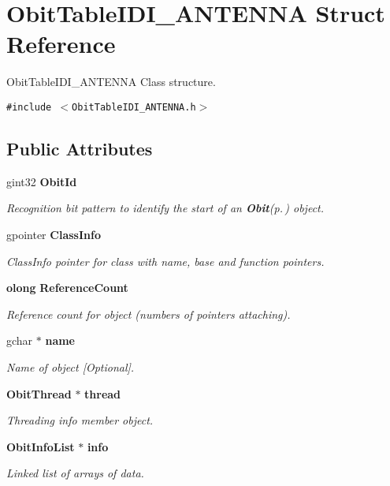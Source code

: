 \section{Obit\-Table\-IDI\_\-ANTENNA Struct Reference}
\label{structObitTableIDI__ANTENNA}
Obit\-Table\-IDI\_\-ANTENNA Class structure.  


{\tt \#include $<$Obit\-Table\-IDI\_\-ANTENNA.h$>$}

\subsection*{Public Attributes}
\begin{CompactItemize}
\item 
gint32 {\bf Obit\-Id}
\begin{CompactList}\small\item\em Recognition bit pattern to identify the start of an {\bf Obit}{\rm (p.\,\pageref{structObit})} object. \item\end{CompactList}\item 
gpointer {\bf Class\-Info}
\begin{CompactList}\small\item\em Class\-Info pointer for class with name, base and function pointers. \item\end{CompactList}\item 
{\bf olong} {\bf Reference\-Count}
\begin{CompactList}\small\item\em Reference count for object (numbers of pointers attaching). \item\end{CompactList}\item 
gchar $\ast$ {\bf name}
\begin{CompactList}\small\item\em Name of object [Optional]. \item\end{CompactList}\item 
{\bf Obit\-Thread} $\ast$ {\bf thread}
\begin{CompactList}\small\item\em Threading info member object. \item\end{CompactList}\item 
{\bf Obit\-Info\-List} $\ast$ {\bf info}
\begin{CompactList}\small\item\em Linked list of arrays of data. \item\end{CompactList}\item 

\end{CompactItemize}
